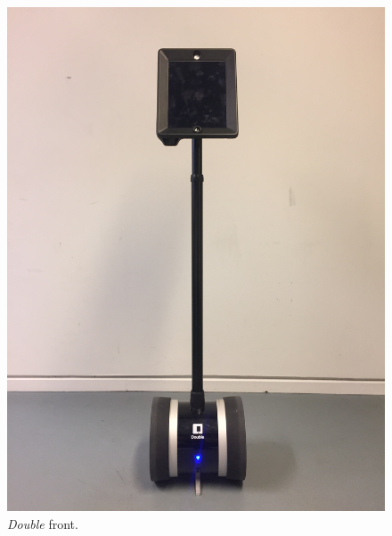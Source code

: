 \begin{figure}[H]
\centering
\begin{minipage}{.25\textwidth}
  \centering
  \includegraphics[width=\linewidth, angle =-90]{Figure/ModificeretDoubleFront}
  \caption{\textit{Double} front.}
  \label{fig:ModificeretDoubleFront}
\end{minipage}%
\begin{minipage}{.25\textwidth}
  \centering

\end{minipage}
\end{figure}
